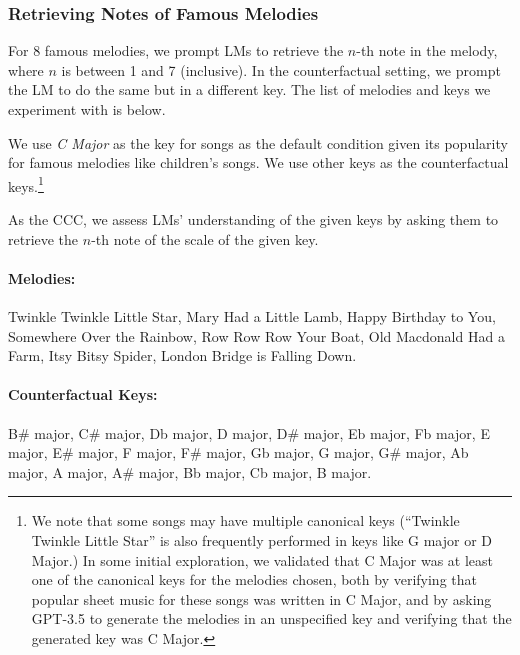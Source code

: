 \subsubsection{Retrieving Notes of Famous Melodies}

For 8 famous melodies, we prompt LMs to retrieve the $n$-th note in the melody, where $n$ is between 1 and 7 (inclusive). In the counterfactual setting, we prompt the LM to do the same but in a different key. The list of melodies and keys we experiment with is below. 

We use \emph{C Major} as the key for songs as the default condition given its popularity for famous melodies like children's songs. We use other keys as the counterfactual keys.\footnote{We note that some songs may have multiple canonical keys (\eg ``Twinkle Twinkle Little Star'' is also frequently performed in keys like G major or D Major.) In some initial exploration, we validated that C Major was at least one of the canonical keys for the melodies chosen, both by verifying that popular sheet music for these songs was written in C Major, and by asking GPT-3.5 to generate the melodies in an unspecified key and verifying that the generated key was C Major.
}

As the CCC, we assess LMs' understanding of the given keys by asking them to retrieve the $n$-th note of the scale of the given key.

\paragraph{Melodies:} Twinkle Twinkle Little Star, Mary Had a Little Lamb, Happy Birthday to You, Somewhere Over the Rainbow, Row Row Row Your Boat, Old Macdonald Had a Farm, Itsy Bitsy Spider, London Bridge is Falling Down.

\paragraph{Counterfactual Keys:} B\# major, C\# major, Db major, D major, D\# major, Eb major, Fb major, E major, E\# major, F major, F\# major, Gb major, G major, G\# major, Ab major, A major, A\# major, Bb major, Cb major, B major.
